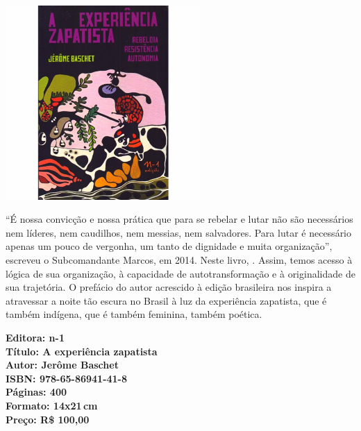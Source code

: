 \begin{center}
\hspace*{.5cm}\includegraphics[width=74mm]{./CAPAS/experiencia.jpg}
\end{center}

\hspace*{-7cm}\hrulefill\hspace*{-7cm}

\medskip

\noindent{}``É nossa convicção e nossa prática que para se rebelar e lutar não são necessários nem líderes, nem caudilhos, nem messias, nem salvadores. Para lutar é necessário apenas um pouco de vergonha, um tanto de dignidade e muita organização'', escreveu o Subcomandante Marcos, em 2014. Neste livro, . Assim, temos acesso à lógica de sua organização, à capacidade de autotransformação e à originalidade de sua trajetória. O prefácio do autor acrescido à edição brasileira nos inspira a atravessar a noite tão escura no Brasil à luz da experiência zapatista, que é também indígena, que é também feminina, também poética.

\vfill

\hspace*{-.4cm}\begin{minipage}[c]{.5\linewidth}
\small\textbf{
\hspace*{-.1cm}Editora: n-1\\
Título: A experiência zapatista\\
Autor: Jerôme Baschet\\
ISBN: 978-65-86941-41-8\\
Páginas: 400\\
Formato: 14x21\,cm\\
Preço: R\$ 100,00\\
}
\end{minipage}

